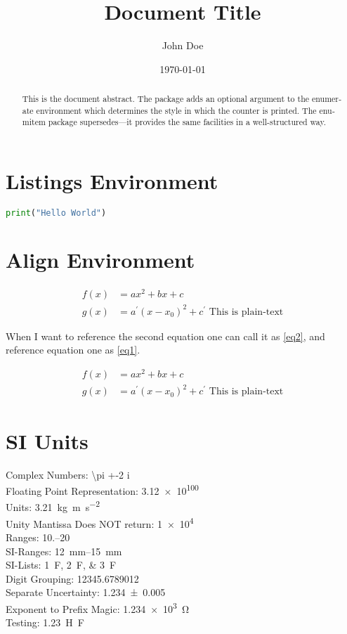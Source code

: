 \documentclass{StdTemplate}
\title{Document Title}
\author{John Doe}
\date{\today}
\begin{document}
%
\begin{abstract}
This is the document abstract. The pack­age adds an op­tional ar­gu­ment to the enu­mer­ate en­vi­ron­ment which de­ter­mines the style in which the counter is printed. The en­u­mitem pack­age su­per­sedes—it pro­vides the same fa­cil­i­ties in a well-struc­tured way.
\end{abstract}
%
%
\section{Listings Environment}
\begin{lstlisting}[language=Python, caption=Now It's Captioned, label=label1]
print("Hello World")
\end{lstlisting}

\section{Align Environment}
\begin{align}
f(x) &= a x^2 + b x + c\label{eq1}\\
g(x) &= a^\prime (x - x_0)^2 + c^\prime \text{ This is plain-text}\label{eq2}
\end{align}

\noindent When I want to reference the second equation one can call it as \ref{eq2}, and reference equation one as \ref{eq1}.

\begin{align*}
f(x) &= a x^2 + b x + c\\
g(x) &= a^\prime (x - x_0)^2 + c^\prime \text{ This is plain-text}
\end{align*}

\section{SI Units}
\noindent Complex Numbers: \num{\pi +-2 i}\\
Floating Point Representation: \num{3.12e100}\\
Units: \SI{3.21}{\kilo\gram\meter\per\second\squared}\\ %
Unity Mantissa Does NOT return: \num{1e4}\\
Ranges: \numrange{10.}{20}\\
SI-Ranges: \SIrange{12}{15}{\milli\metre}\\
SI-Lists: \SIlist{1;2;3}{\farad}\\
Digit Grouping: \num{12345.6789012}\\
Separate Uncertainty: \num{1.234(5)}\\
Exponent to Prefix Magic: \SI{1.234e3}{\ohm}\\
Testing: \SI{1.23}{\henry\farad}
\end{document}
